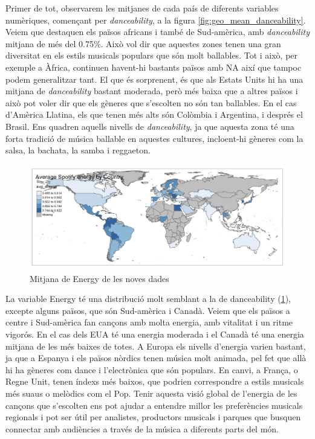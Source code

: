 Primer de tot, observarem les mitjanes de cada país de diferents variables numèriques, començant per \textit{danceability}, a la figura \ref{fig:geo_mean_danceability}. Veiem que destaquen els països africans i també de Sud-amèrica, amb \textit{danceability} mitjana de més del 0.75\%. Això vol dir que aquestes zones tenen una gran diversitat en els estils musicals populars que són molt ballables. Tot i això, per exemple a Àfrica, continuen havent-hi bastants països amb NA així que tampoc podem generalitzar tant. El que és sorprenent, és que als Estats Units hi ha una mitjana de \textit{danceability} bastant moderada, però més baixa que a altres països i això pot voler dir que els gèneres que s'escolten no són tan ballables. En el cas d'Amèrica Llatina, els que tenen més alts són Colòmbia i Argentina, i després el Brasil. Ens quadren aquells nivells de \textit{danceability}, ja que aquesta zona té una forta tradició de música ballable en aquestes cultures, incloent-hi gèneres com la salsa, la bachata, la samba i reggaeton.

\begin{figure}[H]
    \centering
    \includegraphics[width=0.7\linewidth]{Images/7_Geospatial/4_data2024/data2024_energy.png}
    \caption{Mitjana de Energy de les noves dades}
    \label{fig:geo_mean_energy}
\end{figure}

La variable Energy té una distribució molt semblant a la de danceability (\ref{fig:geo_mean_energy}), excepte alguns països, que són Sud-amèrica i Canadà. Veiem que els països a centre i Sud-amèrica fan cançons amb molta energia, amb vitalitat i un ritme vigorós. En el cas dels EUA té una energia moderada i el Canadà té una energia mitjana de les més baixes de totes. A Europa els nivells d'energia varien bastant, ja que a Espanya i els països nòrdics tenen música molt animada, pel fet que allà hi ha gèneres com dance i l'electrònica que són populars. En canvi, a França, o Regne Unit, tenen índexs més baixos, que podrien correspondre a estils musicals més suaus o melòdics com el Pop. Tenir aquesta visió global de l'energia de les cançons que s'escolten ens pot ajudar a entendre millor les preferències musicals regionals i pot ser útil per analistes, productors musicals i parques que busquen connectar amb audiències a través de la música a diferents parts del món.

